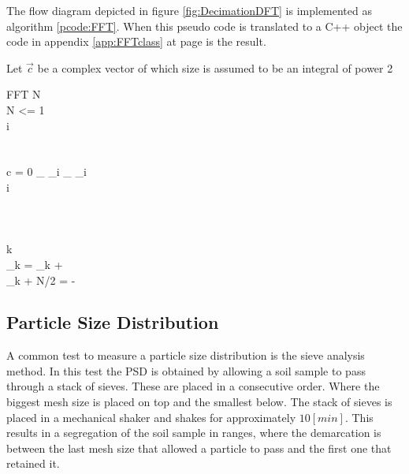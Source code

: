 \documentclass[11pt,fleqn,,a4paper,twoside,openright]{book}
\begin{document}
The flow diagram depicted in figure \ref{fig:DecimationDFT} is implemented as algorithm \ref{pcode:FFT}. When this pseudo code is translated to a C++ object the code in appendix \ref{app:FFTclass} at page \pageref{app:FFTclass} is the result. \\
\begin{sBox}
	Let $ \vec{c} $ be a complex vector of which size is assumed to be an integral of power 2 \\
	\begin{pseudocode}{FFT}{}\label{pcode:FFT}
	N  \\
	\IF N <= 1 \THEN {} \\
	i  \\
	  \\
	  \\
	\FOREACH c \in {} \DO
	\BEGIN
		\IF {} = 0 \THEN {}_{} \GETS {}_i
		\ELSE {}_{} \GETS {}_i \\
		i \\
	\END \\
	
	 \\
	 \\
	
	\FOR k  \TO {} \DO
	\BEGIN
		  \\
		_k = _{k} +  \\
		_{k + N/2} =  -  \\
	\END
	
	\end{pseudocode}
\end{sBox}

\subsection{Particle Size Distribution}\label{Particle Size Distribution}
A common test to measure a particle size distribution is the sieve analysis method. In this test the PSD is obtained by allowing a soil sample to pass through a stack of sieves. These are placed in a consecutive order. Where the biggest mesh size is placed on top and the smallest below. The stack of sieves is placed in a mechanical shaker and shakes for approximately $ 10 [min] $. This results in a segregation of the soil sample in ranges, where the demarcation is between the last mesh size that allowed a particle to pass and the first one that retained it.
\end{document}
